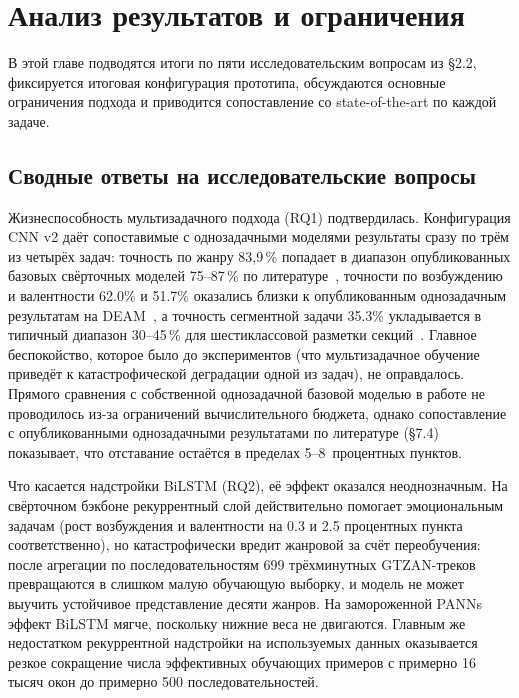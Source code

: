 \chapter{Анализ результатов и ограничения}\label{ch:7}

В этой главе подводятся итоги по пяти исследовательским вопросам из §2.2, фиксируется итоговая конфигурация прототипа, обсуждаются основные ограничения подхода и приводится сопоставление со state-of-the-art по каждой задаче.

\section{Сводные ответы на исследовательские вопросы}\label{sec:7-1}

Жизнеспособность мультизадачного подхода (RQ1) подтвердилась. Конфигурация CNN v2 даёт сопоставимые с однозадачными моделями результаты сразу по трём из четырёх задач: точность по жанру 83{,}9\,\% попадает в диапазон опубликованных базовых свёрточных моделей 75--87\,\% по литературе~\cite{choi2017crnn,sigtia2014improved}, точности по возбуждению и валентности 62.0\% и 51.7\% оказались близки к опубликованным однозадачным результатам на DEAM~\cite{wang2017autotagging,won2020selfattention}, а точность сегментной задачи 35.3\% укладывается в типичный диапазон 30--45\,\% для шестиклассовой разметки секций~\cite{wang2022catchchorus,gong2023structural}. Главное беспокойство, которое было до экспериментов (что мультизадачное обучение приведёт к катастрофической деградации одной из задач), не оправдалось. Прямого сравнения с собственной однозадачной базовой моделью в работе не проводилось из-за ограничений вычислительного бюджета, однако сопоставление с опубликованными однозадачными результатами по литературе (§7.4) показывает, что отставание остаётся в пределах 5--8~процентных пунктов.

Что касается надстройки BiLSTM (RQ2), её эффект оказался неоднозначным. На свёрточном бэкбоне рекуррентный слой действительно помогает эмоциональным задачам (рост возбуждения и валентности на 0.3 и 2.5 процентных пункта соответственно), но катастрофически вредит жанровой за счёт переобучения: после агрегации по последовательностям 699 трёхминутных GTZAN-треков превращаются в слишком малую обучающую выборку, и модель не может выучить устойчивое представление десяти жанров. На замороженной PANNs эффект BiLSTM мягче, поскольку нижние веса не двигаются. Главным же недостатком рекуррентной надстройки на используемых данных оказывается резкое сокращение числа эффективных обучающих примеров с примерно 16 тысяч окон до примерно 500 последовательностей.

